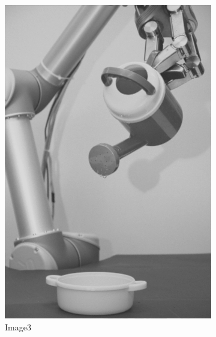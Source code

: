 \documentclass[11pt]{article}
\begin{document}
\begin{figure}[H]
\begin{subfigure}[b]{0.23\textwidth}
        \includegraphics[width=\textwidth]{img3/contrast_5_0_85_final_img3.png}
        \caption{Image3}
        \label{fig:result_img_3}
    \end{subfigure}
    \begin{subfigure}[b]{0.23\textwidth}

\end{subfigure}
\end{figure}
\end{document}
